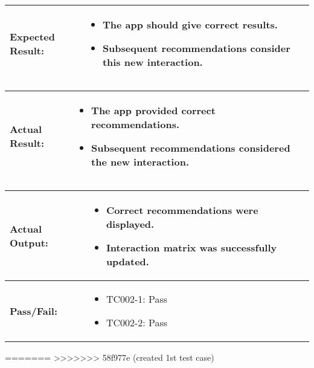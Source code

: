 \documentclass{article}
\begin{document}
\noindent
\begin{tabularx}{\textwidth}{|>{\raggedright\arraybackslash}p{4cm}|X|}
    \hline
    \textbf{Expected Result:} & 
    \begin{itemize}
        \item The app should give correct results.
        \item Subsequent recommendations consider this new interaction.
    \end{itemize}
    \\ \hline
\end{tabularx}

\noindent
\begin{tabularx}{\textwidth}{|>{\raggedright\arraybackslash}p{4cm}|X|}
    \hline
    \textbf{Actual Result:} & 
    \begin{itemize}
        \item The app provided correct recommendations.
        \item Subsequent recommendations considered the new interaction.
    \end{itemize}
    \\ \hline
\end{tabularx}

\noindent
\begin{tabularx}{\textwidth}{|>{\raggedright\arraybackslash}p{4cm}|X|}
    \hline
    \textbf{Actual Output:} & 
    \begin{itemize}
        \item Correct recommendations were displayed.
        \item Interaction matrix was successfully updated.
    \end{itemize}
    \\ \hline
    \textbf{Pass/Fail:} & 
    \begin{itemize}
        \item TC002-1: Pass
        \item TC002-2: Pass
    \end{itemize}
    \\ \hline
\end{tabularx}

=======
>>>>>>> 58f977e (created 1st test case)
\end{document}
